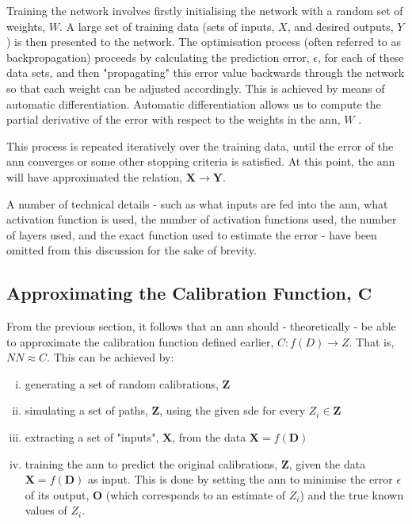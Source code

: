 \documentclass[11pt,oneside,openany,a4paper,english, report, goldenblock
]{usthesis}
\begin{document}
Training the network involves firstly initialising the network with a random set of weights, $W$. A large set of training data (sets of inputs, $X$, and desired outputs, $Y$) is then presented to the network. The optimisation process (often referred to as backpropagation) proceeds by calculating the prediction error, $ \epsilon $, for each of these data sets, and then "propagating" this error value backwards through the network so that each weight can be adjusted accordingly. This is achieved by means of automatic differentiation. Automatic differentiation allows us to compute the partial derivative of the error with respect to the weights in the \acrshort{ann}, $W$ \citep{Werbos}.


This process is repeated iteratively over the training data, until the error of the \acrshort{ann} converges or some other stopping criteria is satisfied. At this point, the \acrshort{ann} will have approximated the relation, $\mathbf{X}\rightarrow \mathbf{Y}$.


A number of technical details - such as what inputs are fed into the \acrshort{ann}, what activation function is used, the number of activation functions used, the number of layers used, and the exact function used to estimate the error - have been omitted from this discussion for the sake of brevity. 

\subsection{Approximating the Calibration Function, $\mathbf{C}$} \label{subsection:neural_networks:approximating_the_calibration_function_C}
From the previous section, it follows that an \acrshort{ann} should - theoretically - be able to approximate the calibration function defined earlier, $C: f \left( D \right) \rightarrow Z$. That is, $NN \approx C$.
This can be achieved by:
\begin{enumerate}[i)]
	\itemsep0em 
	
	\item generating a set of random calibrations, $\mathbf{Z}$
	
	\item simulating a set of paths,  $\mathbf{Z}$, using the given \acrshort{sde} for every  $Z_i \in \mathbf{Z}$
	
	\item extracting a set of "inputs", $\mathbf{X}$, from the data $\mathbf{X} = f\left(\mathbf{D}\right)$
	
	\item training the \acrshort{ann} to predict the original calibrations, $\mathbf{Z}$, given the data $\mathbf{X}=f \left( \mathbf{D} \right)$ as input. This is done by setting the \acrshort{ann} to minimise the error $\epsilon$ of its output, $\mathbf{O}$ (which corresponds to an estimate of $Z_i$) and the true known values of $Z_i$.
	
	
\end{enumerate}
\end{document}
